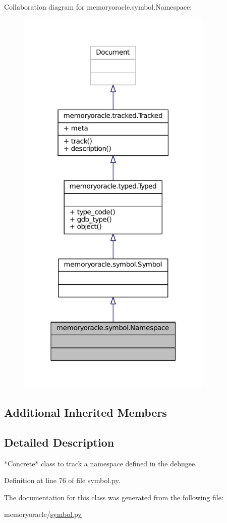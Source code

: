 Collaboration diagram for memoryoracle.\+symbol.\+Namespace\+:
\nopagebreak
\begin{figure}[H]
\begin{center}
\leavevmode
\includegraphics[width=265pt]{classmemoryoracle_1_1symbol_1_1Namespace__coll__graph}
\end{center}
\end{figure}
\subsection*{Additional Inherited Members}


\subsection{Detailed Description}
\begin{DoxyVerb}*Concrete* class to track a namespace defined in the debugee.
\end{DoxyVerb}
 

Definition at line 76 of file symbol.\+py.



The documentation for this class was generated from the following file\+:\begin{DoxyCompactItemize}
\item 
memoryoracle/\hyperlink{symbol_8py}{symbol.\+py}\end{DoxyCompactItemize}
